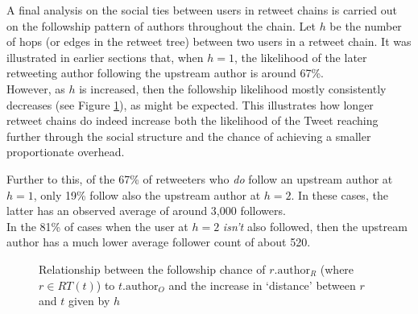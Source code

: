 A final analysis on the social ties between users in retweet chains is carried out on the followship pattern of authors throughout the chain. Let $h$ be the number of hops (or edges in the retweet tree) between two users in a retweet chain. It was illustrated in earlier sections that, when $h = 1$, the likelihood of the later retweeting author following the upstream author is around 67\%.\\
However, as $h$ is increased, then the followship likelihood mostly consistently decreases (see Figure \ref{fig:following-possibility}), as might be expected. This illustrates how longer retweet chains do indeed increase both the likelihood of the Tweet reaching further through the social structure and the chance of achieving a smaller proportionate overhead.

Further to this, of the 67\% of retweeters who \textit{do} follow an upstream author at $h = 1$, only 19\% follow also the upstream author at $h = 2$. In these cases, the latter has an observed average of around 3,000 followers.\\
In the 81\% of cases when the user at $h = 2$ \textit{isn't} also followed, then the upstream author has a much lower average follower count of about 520.

\begin{figure}[h]
\centering
    \caption{Relationship between the followship chance of $r.\textrm{author}_R$ (where $r \in RT(t)$) to $t.\textrm{author}_O$ and the increase in `distance' between $r$ and $t$ given by $h$}
\label{fig:following-possibility}
\end{figure}



